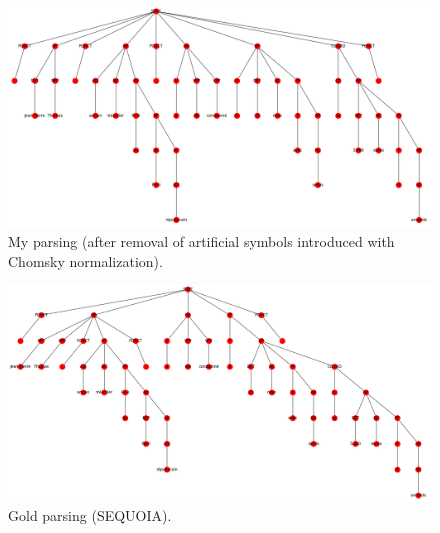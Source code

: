 \documentclass[8pt,twocolumn,letterpaper]{article}
\begin{document}
\begin{figure}[h!]
\begin{center}
\includegraphics[scale=0.3]{report/my_parsing.png}
\caption{My parsing (after removal of artificial symbols introduced with Chomsky normalization).}
\end{center}
\end{figure}


\begin{figure}[h!]
\begin{center}
\includegraphics[scale=0.3]{human_parsing.png}
\caption{Gold parsing (SEQUOIA).}
\end{center}
\end{figure}
\end{document}
